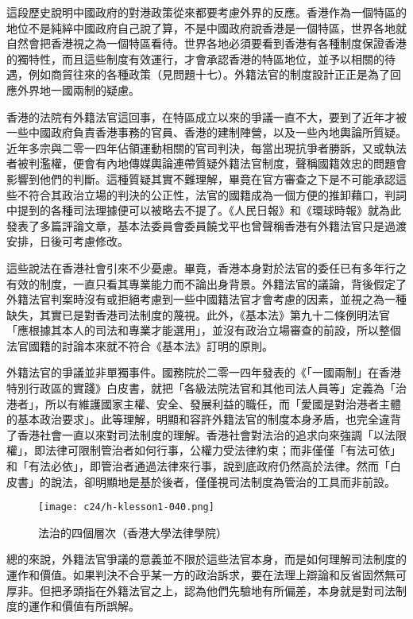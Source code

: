 這段歷史說明中國政府的對港政策從來都要考慮外界的反應。香港作為一個特區的地位不是純綷中國政府自己說了算，不是中國政府說香港是一個特區，世界各地就自然會把香港視之為一個特區看待。世界各地必須要看到香港有各種制度保證香港的獨特性，而且這些制度有效運行，才會承認香港的特區地位，並予以相關的待遇，例如商貿往來的各種政策（見問題十七）。外籍法官的制度設計正正是為了回應外界地一國兩制的疑慮。

香港的法院有外籍法官這回事，在特區成立以來的爭議一直不大，要到了近年才被一些中國政府負責香港事務的官員、香港的建制陣營，以及一些內地輿論所質疑。近年多宗與二零一四年佔領運動相關的官司判決，每當出現抗爭者勝訴，又或執法者被判濫權，便會有內地傳媒輿論連帶質疑外籍法官制度，聲稱國籍效忠的問題會影響到他們的判斷。這種質疑其實不難理解，畢竟在官方審查之下是不可能承認這些不符合其政治立場的判決的公正性，法官的國籍成為一個方便的推卸藉口，判詞中提到的各種司法理據便可以被略去不提了。《人民日報》和《環球時報》就為此發表了多篇評論文章，基本法委員會委員饒戈平也曾聲稱香港有外籍法官只是過渡安排，日後可考慮修改。

這些說法在香港社會引來不少憂慮。畢竟，香港本身對於法官的委任已有多年行之有效的制度，一直只看其專業能力而不論出身背景。外籍法官的議論，背後假定了外籍法官判案時沒有或拒絕考慮到一些中國籍法官才會考慮的因素，並視之為一種缺失，其實已是對香港司法制度的蔑視。此外，《基本法》第九十二條例明法官「應根據其本人的司法和專業才能選用」，並沒有政治立場審查的前設，所以整個法官國籍的討論本來就不符合《基本法》訂明的原則。

外籍法官的爭議並非單獨事件。國務院於二零一四年發表的《「一國兩制」在香港特別行政區的實踐》白皮書，就把「各級法院法官和其他司法人員等」定義為「治港者」，所以有維護國家主權、安全、發展利益的職任，而「愛國是對治港者主體的基本政治要求」。此等理解，明顯和容許外籍法官的制度本身矛盾，也完全違背了香港社會一直以來對司法制度的理解。香港社會對法治的追求向來強調「以法限權」，即法律可限制管治者如何行事，公權力受法律約束；而非僅僅「有法可依」和「有法必依」，即管治者通過法律來行事，說到底政府仍然高於法律。然而「白皮書」的說法，卻明顯地是基於後者，僅僅視司法制度為管治的工具而非前設。

\begin{figure}[htbp]
    \centering
    \texttt{[image: c24/h-klesson1-040.png]}
    \caption{法治的四個層次（香港大學法律學院）} 
\end{figure}

總的來說，外籍法官爭議的意義並不限於這些法官本身，而是如何理解司法制度的運作和價值。如果判決不合乎某一方的政治訴求，要在法理上辯論和反省固然無可厚非。但把矛頭指在外籍法官之上，認為他們先驗地有所偏差，本身就是對司法制度的運作和價值有所誤解。

